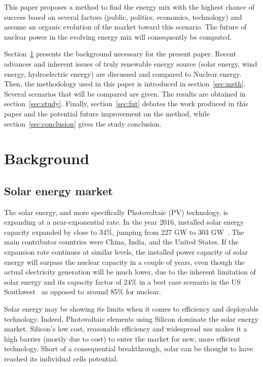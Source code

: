 \documentclass[IJPHM, 2017, 29]{PHMSociety}
\begin{document}
This paper proposes a method to find the energy mix with the highest chance of success based on several factors (public, politics, economics, technology) and assume an organic evolution of the market toward this scenario. The future of nuclear power in the evolving energy mix will consequently be computed.

Section~\ref{sec:bkgd} presents the background necessary for the present paper. Recent advances and inherent issues of truly renewable energy source (solar energy, wind energy, hydroelectric energy) are discussed and compared to Nuclear energy. Then, the methodology used in this paper is introduced in section~\ref{sec:meth}. Several scenarios that will be compared are given. The results are obtained in section~\ref{sec:study}. Finally, section~\ref{sec:fut} debates the work produced in this paper and the potential future improvement on the method, while section~\ref{sec:conclusion} gives the study conclusion.


\section{Background}
\label{sec:bkgd}

\subsection{Solar energy market}

The solar energy, and more specifically Photovoltaic (PV) technology, is expanding at a near-exponential rate. In the year 2016, installed solar energy capacity expanded by close to 34\%, jumping from 227 GW to 303 GW~\citep{iea_solar}. The main contributor countries were China, India, and the United States. If the expansion rate continues at similar levels, the installed power capacity of solar energy will surpass the nuclear capacity in a couple of years, even though the actual electricity generation will be much lower, due to the inherent limitation of solar energy and its capacity factor of 24\% in a best case scenario in the US Southwest~\citep{solar_comp} as opposed to around 85\% for nuclear.

Solar energy may be showing its limits when it comes to efficiency and deployable technology. Indeed, Photovoltaic elements using Silicon dominate the solar energy market. Silicon's low cost, reasonable efficiency and widespread use makes it a high barrier (mostly due to cost) to enter the market for new, more efficient technology. Short of a consequential breakthrough, solar can be thought to have reached its individual cells potential.
\end{document}
